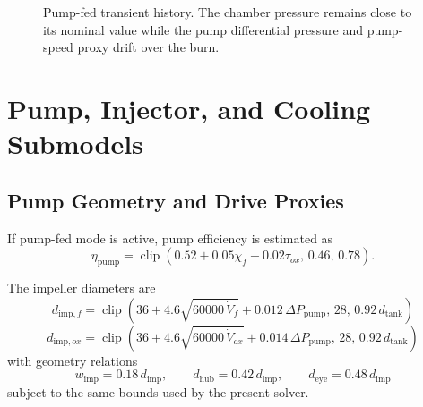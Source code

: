 \documentclass[11pt]{article}
\newcommand{\clip}{\operatorname{clip}}
\begin{document}
\begin{figure}[H]
\centering
{}
\caption{Pump-fed transient history. The chamber pressure remains close to its nominal value while the pump differential pressure and pump-speed proxy drift over the burn.}
\end{figure}

\section{Pump, Injector, and Cooling Submodels}
\subsection{Pump Geometry and Drive Proxies}
If pump-fed mode is active, pump efficiency is estimated as
\begin{equation}
\eta_{\text{pump}}
=
\clip\!\left(0.52+0.05\chi_f-0.02\tau_{ox},\,0.46,\,0.78\right).
\label{eq:pump-eff}
\end{equation}

The impeller diameters are
\begin{equation}
d_{\text{imp},f}
=
\clip\!\left(
36+4.6\sqrt{60000\,\dot{V}_f}+0.012\,\Delta P_{\text{pump}},
\,
28,\,
0.92\,d_{\text{tank}}
\right)
\label{eq:fuel-impeller-dia}
\end{equation}
\begin{equation}
d_{\text{imp},ox}
=
\clip\!\left(
36+4.6\sqrt{60000\,\dot{V}_{ox}}+0.014\,\Delta P_{\text{pump}},
\,
28,\,
0.92\,d_{\text{tank}}
\right)
\label{eq:ox-impeller-dia}
\end{equation}
with geometry relations
\begin{equation}
w_{\text{imp}}=0.18\,d_{\text{imp}},
\qquad
d_{\text{hub}}=0.42\,d_{\text{imp}},
\qquad
d_{\text{eye}}=0.48\,d_{\text{imp}}
\label{eq:impeller-ratios}
\end{equation}
subject to the same bounds used by the present solver.
\end{document}
